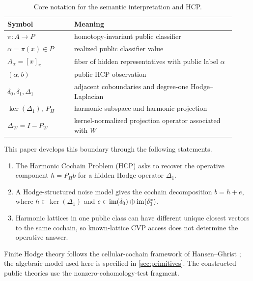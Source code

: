 \begin{table}[ht]
  \centering
  \small
  \begin{tabular}{@{}p{0.27\linewidth}p{0.65\linewidth}@{}}
    \hline
    Symbol & Meaning \\
    \hline
    \(\pi:A\to P\) & homotopy-invariant public classifier \\
    \(\alpha=\pi(x)\in P\) & realized public classifier value \\
    \(A_\alpha=[x]_\pi\) & fiber of hidden representatives with public label \(\alpha\) \\
    \((\alpha,b)\) & public HCP observation \\
    \(\delta_0,\delta_1,\Delta_1\) & adjacent coboundaries and degree-one Hodge--Laplacian \\
    \(\ker(\Delta_1),\ P_H\) & harmonic subspace and harmonic projection \\
    \(\Delta_W=I-P_W\) & kernel-normalized projection operator associated with \(W\) \\
    \hline
  \end{tabular}
  \caption{Core notation for the semantic interpretation and HCP.}
  \label{tab:core-notation}
\end{table}

This paper develops this boundary through the following statements.
\begin{enumerate}[label=(\roman*)]
  \item The Harmonic Cochain Problem (HCP) asks to recover the operative
    component \(h=P_Hb\) for a hidden Hodge operator \(\Delta_1\).
  \item A Hodge-structured noise model gives the cochain decomposition
    \(b = h + e\), where \(h \in \ker(\Delta_1)\) and
    \(e \in \operatorname{im}(\delta_0) \oplus \operatorname{im}(\delta_1^\ast)\).
  \item Harmonic lattices in one public class can have
    different unique closest vectors to the same cochain, so known-lattice
    CVP access does not determine the operative answer.
\end{enumerate}

Finite Hodge theory follows the cellular-cochain framework of
Hansen--Ghrist \cite{hansenGhrist2018sheaves}; the algebraic model used here is
specified in \cref{sec:primitives}. The constructed public theories use
the nonzero-cohomology-test fragment.
